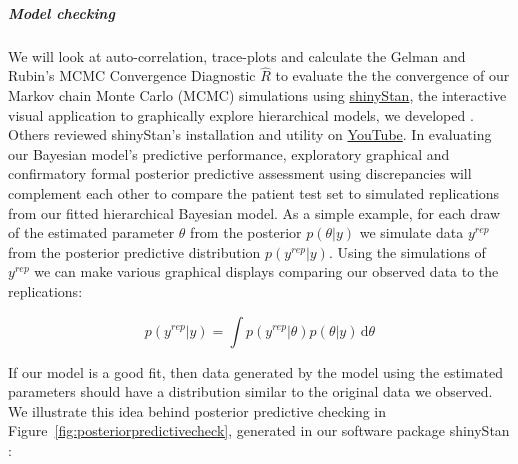 \documentclass[11pt,notitlepage]{article}
\begin{document}
\subparagraph*{Model checking}
We will look at auto-correlation, trace-plots and calculate the Gelman and Rubin's MCMC Convergence Diagnostic $ \hat{R}$ to evaluate the the convergence of our Markov chain Monte Carlo (MCMC) simulations using \href{http://andrewgelman.com/2015/03/02/introducing-shinystan/}{shinyStan}, the interactive visual application to graphically explore hierarchical models, we developed \cite{shinystan-software:2015}. Others reviewed shinyStan's installation and utility on \href{https://www.youtube.com/watch?v=X31xqNHcvQs}{YouTube}. In evaluating our Bayesian model's predictive performance, exploratory graphical \cite{Gelman2004posteriorpredictivechecks} and confirmatory formal posterior predictive assessment using discrepancies \cite{GelmanMengStern1996} will complement each other to compare the patient test set to simulated replications from our fitted hierarchical Bayesian model. As a simple example, for each draw of the estimated parameter $\theta$ from the posterior $p(\theta|y)$ we simulate data $y^{rep}$ from the posterior predictive distribution $ p(y^{rep}|y) $. Using the simulations of $y^{rep}$ we can make various graphical displays comparing our observed data to the replications:

\begin{figure}
\vspace{-11pt}
\begin{equation} \label{eq:predictivecheck}
 p(y^{rep}|y)  = \int \! p(y^{rep}|\theta) p(\theta|y) \, \mathrm{d}\theta 
\end{equation}
\vspace{-20pt}
\end{figure}

If our model is a good fit, then data generated by the model using the estimated parameters should have a distribution similar to the original data we observed. We illustrate this idea behind posterior predictive checking \cite{Gelman_predictive_2000} in Figure~\ref{fig:posteriorpredictivecheck}, generated in our software package shinyStan \cite{shinystan-software:2015}:
\end{document}
